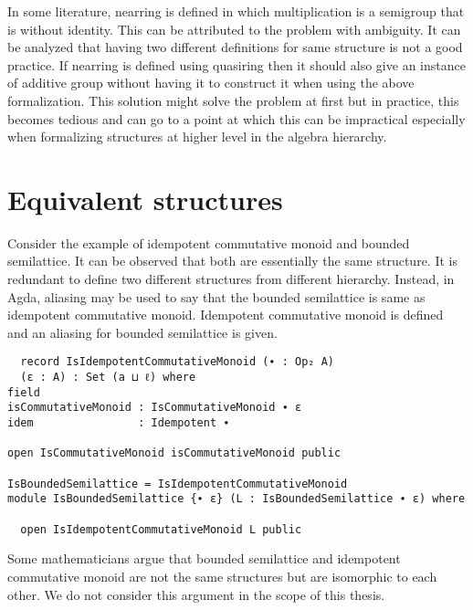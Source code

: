 In some literature, nearring is defined in which multiplication is a
semigroup that is without identity. This can be attributed to the problem with
ambiguity. It can be analyzed that having two different definitions for same
structure is not a good practice. If nearring is defined using quasiring then
it should also give an instance of additive group without having it to construct
it when using the above formalization. This solution might solve the problem at
first but in practice, this becomes tedious and can go to a point at which this
can be impractical especially when formalizing structures at higher level in the
algebra hierarchy.

\section{Equivalent structures}
Consider the example of idempotent commutative monoid and bounded semilattice.
It can be observed that both are essentially the same structure. It is redundant
to define two different structures from different hierarchy. Instead, in Agda,
aliasing may be used to say that the bounded semilattice is same as idempotent
commutative monoid. Idempotent commutative monoid is defined and an aliasing for
bounded semilattice is given.
\begin{verbatim}
  record IsIdempotentCommutativeMonoid (∙ : Op₂ A)
  (ε : A) : Set (a ⊔ ℓ) where
field
isCommutativeMonoid : IsCommutativeMonoid ∙ ε
idem                : Idempotent ∙

open IsCommutativeMonoid isCommutativeMonoid public

IsBoundedSemilattice = IsIdempotentCommutativeMonoid
module IsBoundedSemilattice {∙ ε} (L : IsBoundedSemilattice ∙ ε) where

  open IsIdempotentCommutativeMonoid L public
\end{verbatim}

Some mathematicians argue that bounded semilattice and idempotent
commutative monoid are not the same structures but are isomorphic to each other.
We do not consider this argument in the scope of this thesis.

